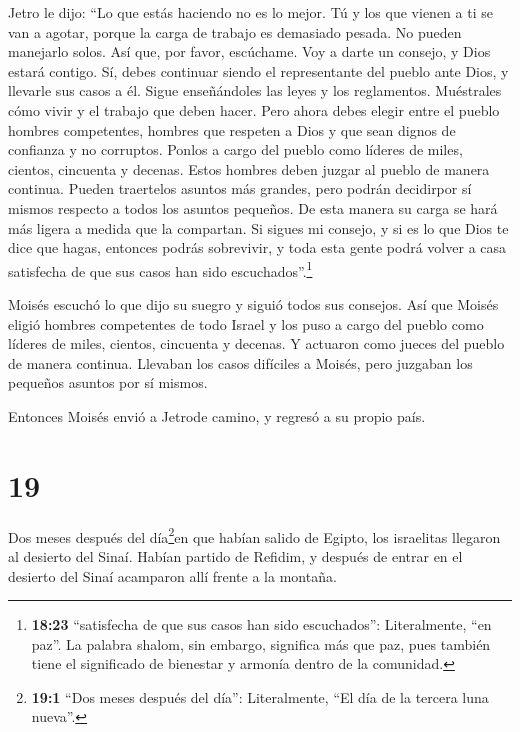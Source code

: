  Jetro le dijo: ``Lo que estás haciendo no es lo mejor.
 Tú y los que vienen a ti se van a agotar, porque la carga
de trabajo es demasiado pesada. No pueden manejarlo solos. 
Así que, por favor, escúchame. Voy a darte un consejo, y Dios estará
contigo. Sí, debes continuar siendo el representante del pueblo ante
Dios, y llevarle sus casos a él.  Sigue enseñándoles las
leyes y los reglamentos. Muéstrales cómo vivir y el trabajo que deben
hacer.  Pero ahora debes elegir entre el pueblo hombres
competentes, hombres que respeten a Dios y que sean dignos de confianza
y no corruptos. Ponlos a cargo del pueblo como líderes de miles,
cientos, cincuenta y decenas.  Estos hombres deben juzgar
al pueblo de manera continua. Pueden traertelos asuntos más grandes,
pero podrán decidirpor sí mismos respecto a todos los asuntos pequeños.
De esta manera su carga se hará más ligera a medida que la compartan.
 Si sigues mi consejo, y si es lo que Dios te dice que
hagas, entonces podrás sobrevivir, y toda esta gente podrá volver a casa
satisfecha de que sus casos han sido escuchados''.\footnote{\textbf{18:23}
  ``satisfecha de que sus casos han sido escuchados'': Literalmente,
  ``en paz''. La palabra shalom, sin embargo, significa más que paz,
  pues también tiene el significado de bienestar y armonía dentro de la
  comunidad.}

 Moisés escuchó lo que dijo su suegro y siguió todos sus
consejos.  Así que Moisés eligió hombres competentes de
todo Israel y los puso a cargo del pueblo como líderes de miles,
cientos, cincuenta y decenas.  Y actuaron como jueces del
pueblo de manera continua. Llevaban los casos difíciles a Moisés, pero
juzgaban los pequeños asuntos por sí mismos.

 Entonces Moisés envió a Jetrode camino, y regresó a su
propio país.

\hypertarget{section-18}{%
\section{19}\label{section-18}}

 Dos meses después del día\footnote{\textbf{19:1} ``Dos
  meses después del día'': Literalmente, ``El día de la tercera luna
  nueva''.}en que habían salido de Egipto, los israelitas llegaron al
desierto del Sinaí.  Habían partido de Refidim, y después de
entrar en el desierto del Sinaí acamparon allí frente a la montaña.

